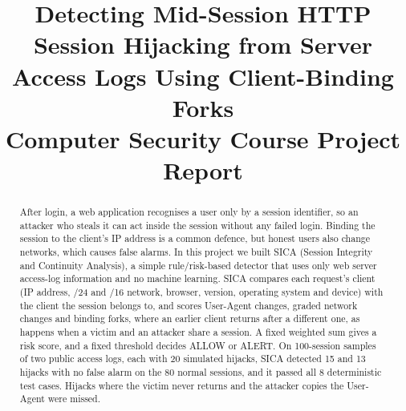 \documentclass[conference]{IEEEtran}
\begin{document}
\title{Detecting Mid-Session HTTP Session Hijacking from Server Access Logs Using Client-Binding Forks\\[0.6ex]
{\large Computer Security Course Project Report}}

\author{%
}

\maketitle

\begin{abstract}
After login, a web application recognises a user only by a session identifier,
so an attacker who steals it can act inside the session without any failed
login. Binding the session to the client's IP address is a common defence, but
honest users also change networks, which causes false alarms. In this project we
built SICA (Session Integrity and Continuity Analysis), a simple rule/risk-based
detector that uses only web server access-log information and no machine
learning. SICA compares each request's client (IP address, /24 and /16 network,
browser, version, operating system and device) with the client the session
belongs to, and scores User-Agent changes, graded network changes and binding
forks, where an earlier client returns after a different one, as happens when a
victim and an attacker share a session. A fixed weighted sum gives a risk score,
and a fixed threshold decides ALLOW or ALERT. On 100-session samples of two
public access logs, each with 20 simulated hijacks, SICA detected 15 and 13
hijacks with no false alarm on the 80 normal sessions, and it passed all 8
deterministic test cases. Hijacks where the victim never returns and the
attacker copies the User-Agent were missed.
\end{abstract}
\end{document}
